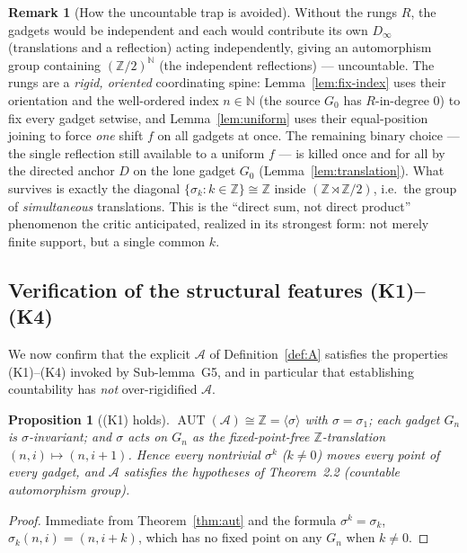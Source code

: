 \documentclass[12pt,fullpage]{article}
\newtheorem{proposition}[theorem]{Proposition}
\theoremstyle{definition}
\newtheorem{remark}[theorem]{Remark}
\newcommand{\A}{\mathcal{A}}
\newcommand{\N}{\mathbb{N}}
\newcommand{\Z}{{\mathbb{Z}}}
\newcommand{\AUT}{\operatorname{AUT}}
\begin{document}
\begin{remark}[How the uncountable trap is avoided]\label{rem:trap}
Without the rungs $R$, the gadgets would be independent and each would
contribute its own $D_\infty$ (translations and a reflection) acting
independently, giving an automorphism group containing
$(\Z/2)^{\N}$ (the independent reflections) --- uncountable.  The rungs are a
\emph{rigid, oriented} coordinating spine: Lemma~\ref{lem:fix-index} uses
their orientation and the well-ordered index $n\in\N$ (the source $G_0$ has
$R$-in-degree $0$) to fix every gadget setwise, and Lemma~\ref{lem:uniform}
uses their equal-position joining to force \emph{one} shift $f$ on all gadgets
at once.  The remaining binary choice --- the single reflection still available
to a uniform $f$ --- is killed once and for all by the directed anchor $D$ on
the lone gadget $G_0$ (Lemma~\ref{lem:translation}).  What survives is exactly
the diagonal $\{\sigma_k:k\in\Z\}\cong\Z$ inside $(\Z\rtimes\Z/2)$, i.e.\ the
group of \emph{simultaneous} translations.  This is the ``direct sum, not
direct product'' phenomenon the critic anticipated, realized in its strongest
form: not merely finite support, but a single common $k$.
\end{remark}

\subsection*{Verification of the structural features (K1)--(K4)}

We now confirm that the explicit $\A$ of Definition~\ref{def:A} satisfies the
properties (K1)--(K4) invoked by Sub-lemma~G5, and in particular that
establishing countability has \emph{not} over-rigidified $\A$.

\begin{proposition}[(K1) holds]\label{prop:K1}
$\AUT(\A)\cong\Z=\langle\sigma\rangle$ with $\sigma=\sigma_1$; each gadget
$G_n$ is $\sigma$-invariant; and $\sigma$ acts on $G_n$ as the fixed-point-free
$\Z$-translation $(n,i)\mapsto(n,i+1)$.  Hence every nontrivial $\sigma^k$
($k\ne0$) moves every point of every gadget, and $\A$ satisfies the hypotheses
of Theorem~2.2 (countable automorphism group).
\end{proposition}

\begin{proof}
Immediate from Theorem~\ref{thm:aut} and the formula
$\sigma^k=\sigma_k$, $\sigma_k(n,i)=(n,i+k)$, which has no fixed point on any
$G_n$ when $k\ne 0$.
\end{proof}
\end{document}

